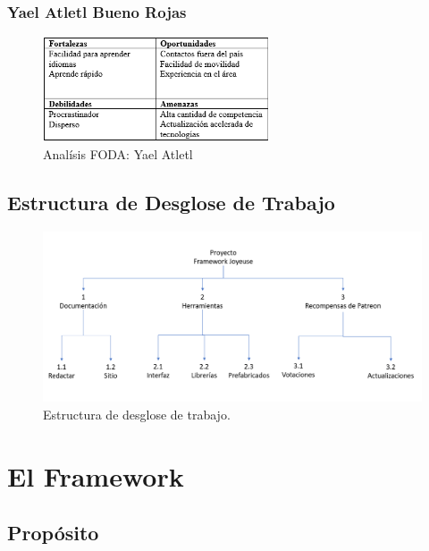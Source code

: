 \documentclass[]{article}
\begin{document}
\subsubsection{Yael Atletl Bueno Rojas}

\begin{figure}[H]
	
	\centering
	\includegraphics[width=0.6\textwidth]{yael}
	\caption{Anal\'isis FODA: Yael Atletl}
	
\end{figure}

\subsection{Estructura de Desglose de Trabajo}
\begin{figure}[H]
	
	\centering
	\includegraphics[width=1\textwidth]{EDT}
	\caption{Estructura de desglose de trabajo.} 
	\label{EDT}
	
\end{figure}


\section{El Framework}


\subsection{Prop\'osito}
\end{document}
